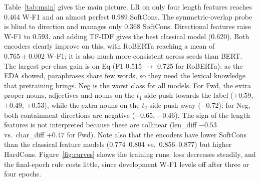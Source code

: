 \documentclass[10pt,a4paper,twocolumn]{article}
\begin{document}
Table~\ref{tab:main} gives the main picture. LR on only four length features reaches 0.464 W-F1 and an almost perfect 0.989 SoftCons. The symmetric-overlap probe is blind to direction and manages only 0.368 SoftCons. Directional features raise W-F1 to 0.593, and adding TF-IDF gives the best classical model (0.620). Both encoders clearly improve on this, with RoBERTa reaching a mean of $0.765 \pm 0.002$ W-F1; it is also much more consistent across seeds than BERT. The largest per-class gain is on Eq (F1 0.515 $\to$ 0.725 for RoBERTa): as the EDA showed, paraphrases share few words, so they need the lexical knowledge that pretraining brings. Neg is the worst class for all models. For Fwd, the extra proper nouns, adjectives and nouns on the $t_1$ side push towards the label ($+0.59$, $+0.49$, $+0.53$), while the extra nouns on the $t_2$ side push away ($-0.72$); for Neg, both containment directions are negative ($-0.65$, $-0.46$). The sign of the length features is not interpreted because these are collinear (len\_diff $-0.53$ vs.\ char\_diff $+0.47$ for Fwd). Note also that the encoders have lower SoftCons than the classical feature models (0.774--0.804 vs.\ 0.856--0.877) but higher HardCons. Figure~\ref{fig:curves} shows the training runs: loss decreases steadily, and the final-epoch rule costs little, since development W-F1 levels off after three or four epochs.

\begin{table}[!t]
\centering
\small
{}
\caption{Development-set results with the official scorer. W-F1, SoftCons and HardCons are the official metrics.}
\label{tab:main}
\end{table}
\end{document}
